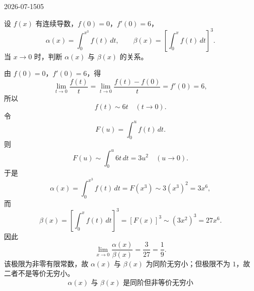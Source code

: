 \begin{mistake}{2026-07-15}{05}

\begin{problemcontent}
设 \(f(x)\) 有连续导数，\(f(0)=0\)，\(f'(0)=6\)，
\[
\alpha(x)=\int_0^{x^3} f(t)\,dt,\qquad
\beta(x)=\left[\int_0^x f(t)\,dt\right]^3.
\]
当 \(x\to 0\) 时，判断 \(\alpha(x)\) 与 \(\beta(x)\) 的关系。
\end{problemcontent}

\begin{solutioncontent}
由 \(f(0)=0\)，\(f'(0)=6\)，得
\[
\lim_{t\to 0}\frac{f(t)}{t}
=\lim_{t\to 0}\frac{f(t)-f(0)}{t}=f'(0)=6,
\]
所以
\[
f(t)\sim 6t\quad (t\to 0).
\]
令
\[
F(u)=\int_0^u f(t)\,dt.
\]
则
\[
F(u)\sim \int_0^u 6t\,dt=3u^2\quad (u\to 0).
\]
于是
\[
\alpha(x)=\int_0^{x^3}f(t)\,dt=F(x^3)\sim 3(x^3)^2=3x^6,
\]
而
\[
\beta(x)=\left[\int_0^x f(t)\,dt\right]^3=[F(x)]^3\sim (3x^2)^3=27x^6.
\]
因此
\[
\lim_{x\to 0}\frac{\alpha(x)}{\beta(x)}
=\frac{3}{27}=\frac19.
\]
该极限为非零有限常数，故 \(\alpha(x)\) 与 \(\beta(x)\) 为同阶无穷小；但极限不为 \(1\)，故二者不是等价无穷小。
\[
\boxed{\alpha(x)\text{ 与 }\beta(x)\text{ 是同阶但非等价无穷小}}
\]
\end{solutioncontent}


\end{mistake}
